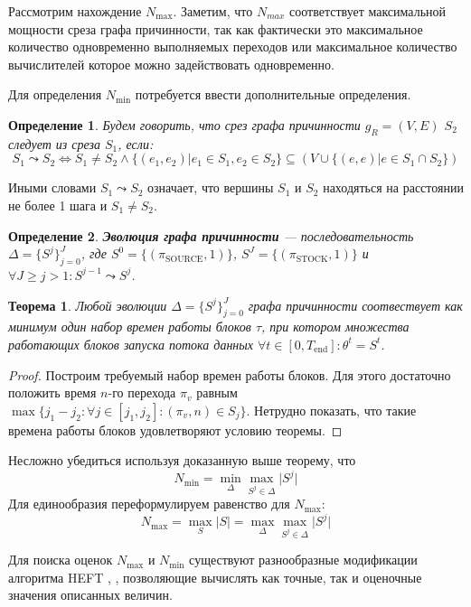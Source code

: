 \documentclass[10pt,a4paper]{article}
\newtheorem{defen}{Определение}
\newtheorem{theorem}{Теорема}
\newcommand{\stock}{\text{STOCK}}
\newcommand{\source}{\text{SOURCE}}
\begin{document}
  Рассмотрим нахождение $N_{\max}$. Заметим, что $N_{max}$ соответствует максимальной мощности среза графа причинности, так как фактически это максимальное
  количество одновременно выполняемых переходов или максимальное количество вычислителей которое можно задействовать одновременно.
  
  Для определения $N_{\min}$ потребуется ввести дополнительные определения.
  \begin{defen}
    Будем говорить, что срез графа причинности $g_R = (V, E)$ $S_2$ следует из среза $S_1$, если:
    $$S_1 \leadsto S_2 \Leftrightarrow S_1 \neq S_2 \wedge \{(e_1, e_2) \vert e_1 \in S_1, e_2 \in S_2\} \subseteq (V \cup \{(e, e) \vert e \in S_1 \cap S_2\})$$
  \end{defen}
  Иными словами $S_1 \leadsto S_2$ означает, что вершины $S_1$ и $S_2$ находяться на расстоянии не более 1 шага и $S_1 \neq S_2$.
  
  \begin{defen}
    \textbf{Эволюция графа причинности} --- последовательность $\Delta = \{S^j\}^{J}_{j = 0}$, где $S^0 = \{(\pi_{\source}, 1)\}$,
    $S^J = \{(\pi_{\stock}, 1)\}$ и $\forall J \geq j > 1: S^{j - 1} \leadsto S^j$.
  \end{defen}
  
  \begin{theorem}
    Любой эволюции $\Delta = \{S^j\}^J_{j = 0}$ графа причинности соотвествует как минимум один набор времен работы блоков $\tau$, при котором
    множества работающих блоков запуска потока данных $\forall t \in [0, T_{\text{end}}]: \theta^t = S^t$.
  \end{theorem}
  \begin{proof}
    Построим требуемый набор времен работы блоков. Для этого достаточно положить время $n$-го перехода $\pi_v$ равным
    $\max \{j_1 - j_2: \forall j \in [j_1, j_2]: (\pi_v, n) \in S_j\}$. Нетрудно показать, что такие времена работы блоков удовлетворяют условию теоремы.
  \end{proof}
  
  Несложно убедиться используя доказанную выше теорему, что $$N_{\min} = \min_{\Delta} \max_{S^j \in \Delta} \lvert S^j \rvert$$
  Для единообразия переформулируем равенство для $N_{\max}$:
  $$N_{\max} = \max_{S} \lvert S \rvert = \max_{\Delta} \max_{S^j \in \Delta} \lvert S^j \rvert$$
  
  Для поиска оценок $N_{\max}$ и $N_{\min}$ существуют разнообразные модификации алгоритма HEFT \cite{heft}, \cite{yaheft},
  позволяющие вычислять как точные, так и оценочные значения описанных величин.
  
\end{document}
